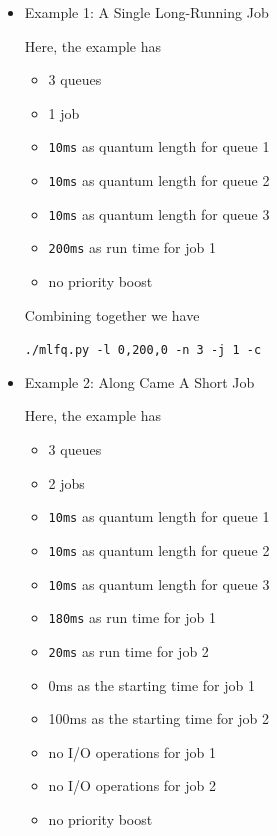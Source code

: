 \documentclass[12pt]{article}
\begin{document}
\begin{enumerate}[1.]
    \bigskip

    \begin{itemize}
        \item Example 1: A Single Long-Running Job

        \bigskip

        Here, the example has

        \begin{itemize}
            \item 3 queues
            \item 1 job
            \item \texttt{10ms} as quantum length for queue 1
            \item \texttt{10ms} as quantum length for queue 2
            \item \texttt{10ms} as quantum length for queue 3
            \item \texttt{200ms} as run time for job 1
            \item no priority boost
        \end{itemize}

        \bigskip

        Combining together we have

        \texttt{./mlfq.py -l 0,200,0 -n 3 -j 1 -c}

        \item Example 2: Along Came A Short Job

        \bigskip

        Here, the example has

        \begin{itemize}
            \item 3 queues
            \item 2 jobs
            \item \texttt{10ms} as quantum length for queue 1
            \item \texttt{10ms} as quantum length for queue 2
            \item \texttt{10ms} as quantum length for queue 3
            \item \texttt{180ms} as run time for job 1
            \item \texttt{20ms} as run time for job 2
            \item 0ms as the starting time for job 1
            \item 100ms as the starting time for job 2
            \item no I/O operations for job 1
            \item no I/O operations for job 2
            \item no priority boost
        \end{itemize}


\end{itemize}
\end{enumerate}
\end{document}
